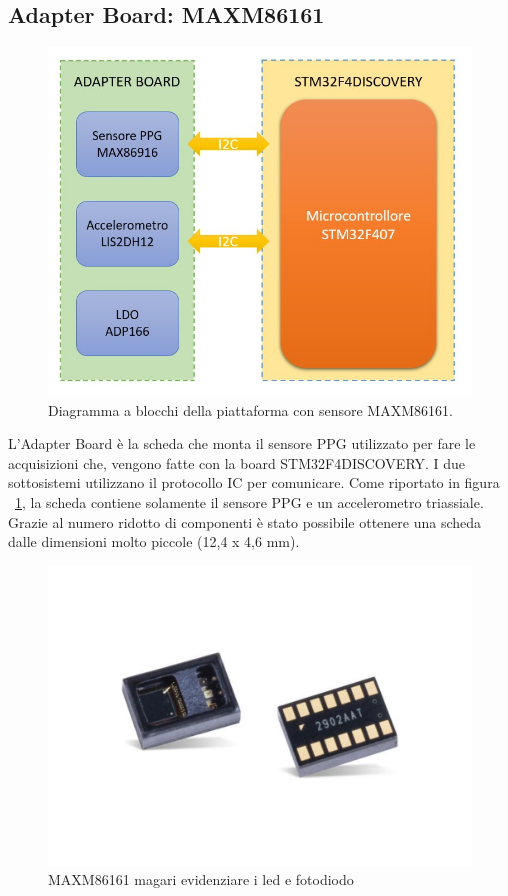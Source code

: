 \subsection{Adapter Board: MAXM86161}
\begin{figure}[h]
	\centering
	\includegraphics[width=0.8\linewidth]{ImageFiles/Hardware/diagramma_blocchi_MAXM}
	\caption{Diagramma a blocchi della piattaforma con sensore MAXM86161.}
	\label{fig:diagramma_blocchi_MAXM}
\end{figure}
L'Adapter Board è la scheda che monta il sensore PPG utilizzato per fare le acquisizioni che, vengono fatte con la board STM32F4DISCOVERY. I due sottosistemi utilizzano il protocollo IC per comunicare. 
Come riportato in figura \Fig~\ref{fig:diagramma_blocchi_MAXM}, la scheda contiene solamente il sensore PPG e un accelerometro triassiale. Grazie al numero ridotto di componenti è stato possibile ottenere una scheda dalle dimensioni molto piccole (12,4 x 4,6 mm).
\begin{figure}[h]
	\centering
	\includegraphics[width=0.8\linewidth]{ImageFiles/Hardware/MAXM86161_Layout}
	\caption{MAXM86161 magari evidenziare i led e fotodiodo}
	\label{fig:MAXM86161_Layout}
\end{figure}
